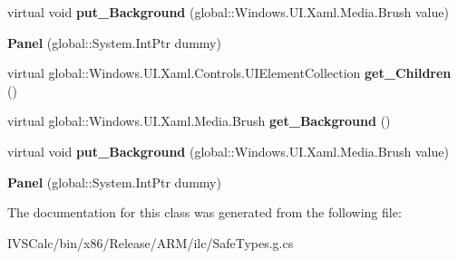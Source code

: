 \begin{DoxyCompactItemize}
virtual void {\bfseries put\+\_\+\+Background} (global\+::\+Windows.\+U\+I.\+Xaml.\+Media.\+Brush value)
\item 
\mbox{\label{class_windows_1_1_u_i_1_1_xaml_1_1_controls_1_1_panel_a54383ce894f6c3de91f81d884cf66b58}} 
{\bfseries Panel} (global\+::\+System.\+Int\+Ptr dummy)
\item 
\mbox{\label{class_windows_1_1_u_i_1_1_xaml_1_1_controls_1_1_panel_af652e8d7f7eb0e90f25b776e09bf3dcf}} 
virtual global\+::\+Windows.\+U\+I.\+Xaml.\+Controls.\+U\+I\+Element\+Collection {\bfseries get\+\_\+\+Children} ()
\item 
\mbox{\label{class_windows_1_1_u_i_1_1_xaml_1_1_controls_1_1_panel_a61659c9c3ceb21efd89dbd5ddb273f97}} 
virtual global\+::\+Windows.\+U\+I.\+Xaml.\+Media.\+Brush {\bfseries get\+\_\+\+Background} ()
\item 
\mbox{\label{class_windows_1_1_u_i_1_1_xaml_1_1_controls_1_1_panel_a7cc43ef5117674ef84ccfbb8892c77e9}} 
virtual void {\bfseries put\+\_\+\+Background} (global\+::\+Windows.\+U\+I.\+Xaml.\+Media.\+Brush value)
\item 
\mbox{\label{class_windows_1_1_u_i_1_1_xaml_1_1_controls_1_1_panel_a54383ce894f6c3de91f81d884cf66b58}} 
{\bfseries Panel} (global\+::\+System.\+Int\+Ptr dummy)
\end{DoxyCompactItemize}


The documentation for this class was generated from the following file\+:\begin{DoxyCompactItemize}
\item 
I\+V\+S\+Calc/bin/x86/\+Release/\+A\+R\+M/ilc/Safe\+Types.\+g.\+cs\end{DoxyCompactItemize}
